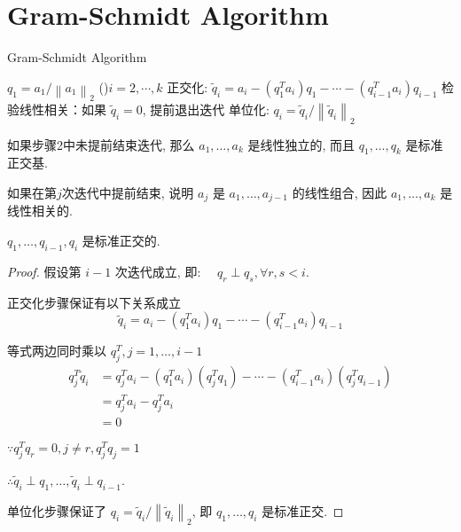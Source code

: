 \section{Gram-Schmidt Algorithm}
\label{Chap:Gram-Schmidt Algorithm}
\begin{algorithm}[htbp]
    \caption{Gram-Schmidt Algorithm}
    $ q_{1}=a_{1} /\left\|a_{1}\right\|_{2} $\;
    \While(){$i=2,\cdots,k$}{
        正交化: $ \widetilde{q}_{i}=a_{i}-\left(q_{1}^{T} a_{i}\right) q_{1}-\cdots-\left(q_{i-1}^{T} a_{i}\right) q_{i-1} $\;
        检验线性相关：如果 $ \widetilde{q}_{i}=0 $, 提前退出迭代\;
        单位化: $ q_{i}=\widetilde{q}_{i} /\left\|\widetilde{q}_{i}\right\|_{2} $\;
    }
\end{algorithm}

如果步骤2中未提前结束迭代, 那么 $ a_{1}, \ldots, a_{k} $ 是线性独立的, 而且 $ q_{1}, \ldots, q_{k} $ 是标准正交基. 

如果在第$j$次迭代中提前结束, 说明 $ a_{j} $ 是 $ a_{1}, \ldots, a_{j-1} $ 的线性组合, 因此 $ a_{1}, \ldots, a_{k} $ 是线性相关的. 

\begin{theorem}
    \label{thm: qs-are-orthogonal}

    $q_{1}, \ldots, q_{i-1}, q_{i} $ 是标准正交的. 
\end{theorem}

\begin{proof}
    假设第 $ i-1 $ 次迭代成立,  即: $ \quad q_{r} \perp q_{s}, \forall r, s<i $.

    正交化步骤保证有以下关系成立
    $$ \widetilde{q}_{i}=a_{i}-\left(q_{1}^{T} a_{i}\right) q_{1}-\cdots-\left(q_{i-1}^{T} a_{i}\right) q_{i-1} $$

    等式两边同时乘以 $ q_{j}^{T}, j=1, \ldots, i-1 $
    $$ \begin{aligned} q_{j}^{T} \tilde{q}_{i} &=q_{j}^{T} a_{i}-\left(q_{1}^{T} a_{i}\right)\left(q_{j}^{T} q_{1}\right)-\cdots-\left(q_{i-1}^{T} a_{i}\right)\left(q_{j}^{T} q_{i-1}\right) \\ &=q_{j}^{T} a_{i}-q_{j}^{T} a_{i}
        \\ &=0  \end{aligned} $$

    $ \because q_{j}^{T} q_{r}=0, j \neq r, q_{j}^{T} q_{j}=1 $

     $\therefore \widetilde{q}_{i} \perp q_{1}, \ldots, \widetilde{q}_{i} \perp q_{i-1} $.

    单位化步骤保证了 $ q_{i}=\widetilde{q}_{i} /\left\|\widetilde{q}_{i}\right\|_{2} $, 即 $ q_{1}, \ldots, q_{i} $ 是标准正交. 
\end{proof}

